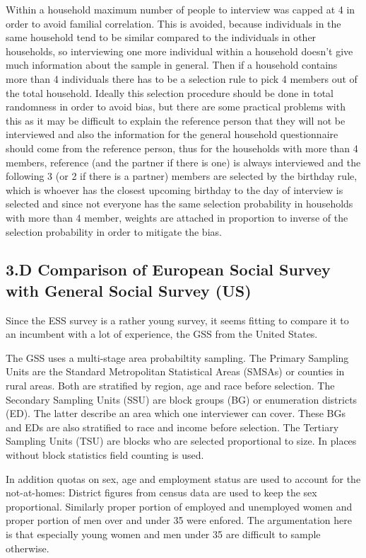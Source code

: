 Within a household maximum number of people to interview was capped at 4 in order to avoid familial correlation. This is avoided, because individuals in the same household tend to be similar compared to the individuals in other households, so interviewing one more individual within a household doesn't give much information about the sample in general. Then if a household contains more than 4 individuals there has to be a selection rule to pick 4 members out of the total household. Ideally this selection procedure should be done in total randomness in order to avoid bias, but there are some practical problems with this as it may be difficult to explain the reference person that they will not be interviewed and also the information for the general household questionnaire should come from the reference person, thus for the households with more than 4 members, reference (and the partner if there is one) is always interviewed and the following 3 (or 2 if there is a partner) members are selected by the birthday rule, which is whoever has the closest upcoming birthday to the day of interview is selected and since not everyone has the same selection probability in households with more than 4 member, weights are attached in proportion to inverse of the selection probability in order to mitigate the bias.

\subsection*{3.D Comparison of European Social Survey with General Social Survey (US) }

Since the ESS survey is a rather young survey, it seems fitting to compare it to an incumbent with a lot of experience, the GSS from the United States.

The GSS uses a multi-stage area probabiltity sampling.
The Primary Sampling Units are the Standard Metropolitan Statistical Areas (SMSAs) or counties in rural areas. Both are stratified by region, age and race before selection. 
The Secondary Sampling Units (SSU) are block groups (BG) or enumeration districts (ED). The latter describe an area which one interviewer can cover. These BGs and EDs are also stratified to race and income before selection. The Tertiary Sampling Units  (TSU) are blocks who are selected proportional to size. In places without block statistics field counting is used. 

In addition quotas on sex, age and employment status are used to account for the not-at-homes: District figures from census data are used to keep the sex proportional. Similarly proper portion of employed and unemployed women and proper portion of men over and under 35 were enfored. The argumentation here is that especially young women and men under 35 are difficult to sample otherwise. 

